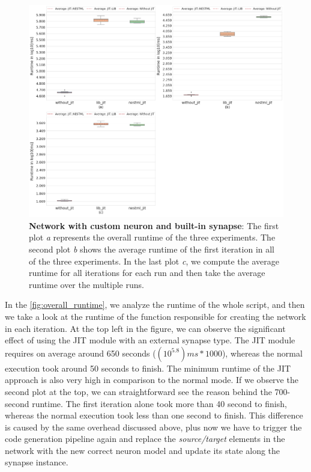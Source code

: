 \begin{figure}[ht!]
    \centering
    \includegraphics[width=\textwidth]{src/pic/three_plots.png}
    \caption{\textbf{Network with custom neuron and built-in synapse}: The first plot \emph{a} represents the overall runtime of the three experiments. The second plot \emph{b} shows the average runtime of the first iteration in all of the three experiments. In the last plot \emph{c}, we compute the average runtime for all iterations for each run and then take the average runtime over the multiple runs. }
    \label{fig:overall_runtime}
\end{figure}

In the \autoref{fig:overall_runtime}, we analyze the runtime of the whole script, and then we take a look at the runtime of the function responsible for creating the network in each iteration. At the top left in the figure, we can observe the significant effect of using the JIT module with an external synapse type.  The JIT module requires on average around 650 seconds ($(10^{5.8})ms * 1000$), whereas the normal execution took around 50 seconds to finish. The minimum runtime of the JIT approach is also very high in comparison to the normal mode. If we observe the second plot at the top, we can straightforward see the reason behind the 700-second runtime. The first iteration alone took more than 40 second to finish, whereas the normal execution took less than one second to finish. This difference is caused by the same overhead discussed above, plus now we have to  trigger the code generation pipeline again and replace the \emph{source/target} elements in the network with the new correct neuron model and update its state along the synapse instance. 

